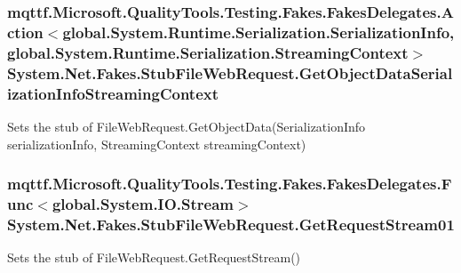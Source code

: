 \hypertarget{class_system_1_1_net_1_1_fakes_1_1_stub_file_web_request_abfc5d09d4f60a523fd163ab58fb20674}{
\subsubsection[{Get\-Object\-Data\-Serialization\-Info\-Streaming\-Context}]{\setlength{\rightskip}{0pt plus 5cm}mqttf.\-Microsoft.\-Quality\-Tools.\-Testing.\-Fakes.\-Fakes\-Delegates.\-Action$<$global.\-System.\-Runtime.\-Serialization.\-Serialization\-Info, global.\-System.\-Runtime.\-Serialization.\-Streaming\-Context$>$ System.\-Net.\-Fakes.\-Stub\-File\-Web\-Request.\-Get\-Object\-Data\-Serialization\-Info\-Streaming\-Context}}\label{class_system_1_1_net_1_1_fakes_1_1_stub_file_web_request_abfc5d09d4f60a523fd163ab58fb20674}


Sets the stub of File\-Web\-Request.\-Get\-Object\-Data(\-Serialization\-Info serialization\-Info, Streaming\-Context streaming\-Context)

\hypertarget{class_system_1_1_net_1_1_fakes_1_1_stub_file_web_request_aafd3f1694faaba5984d7e0322e050ea0}{
\subsubsection[{Get\-Request\-Stream01}]{\setlength{\rightskip}{0pt plus 5cm}mqttf.\-Microsoft.\-Quality\-Tools.\-Testing.\-Fakes.\-Fakes\-Delegates.\-Func$<$global.\-System.\-I\-O.\-Stream$>$ System.\-Net.\-Fakes.\-Stub\-File\-Web\-Request.\-Get\-Request\-Stream01}}\label{class_system_1_1_net_1_1_fakes_1_1_stub_file_web_request_aafd3f1694faaba5984d7e0322e050ea0}


Sets the stub of File\-Web\-Request.\-Get\-Request\-Stream()

